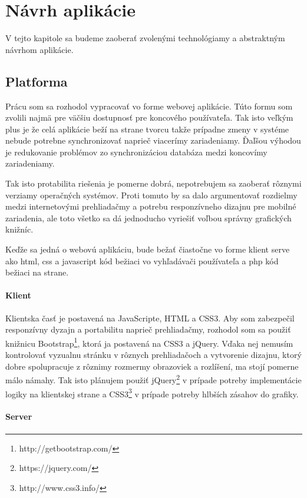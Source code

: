 \newpage

\section{Návrh aplikácie}

V tejto kapitole sa budeme zaoberať zvolenými technológiamy a abstraktným návrhom 
aplikácie.

\subsection{Platforma}

Prácu som sa rozhodol vypracovať vo forme webovej aplikácie.
Túto formu som zvolili najmä pre väčšiu dostupnosť pre koncového používateľa.
Tak isto veľkým plus je že celá aplikácie beží na strane tvorcu takže prípadne zmeny 
v systéme nebude potrebne synchronizovať naprieč viacerímy zariadeniamy. 
Ďaľšou výhodou je redukovanie problémov zo synchronizáciou databáza medzi koncovímy
zariadeniamy.

Tak isto protabilita riešenia je pomerne dobrá, nepotrebujem sa zaoberať rôznymi verziamy
operačných systémov. Proti tomuto by sa dalo argumentovať rozdielmy medzi 
internetovými prehliadačmy a potrebu responzívneho dizajnu pre mobilné zariadenia,
ale toto všetko sa dá jednoducho vyriešiť voľbou správny grafických knižníc.

Keďže sa jedná o webovú aplikáciu, bude bežať čiastočne vo forme klient serve ako 
html, css a javascript kód bežiaci vo vyhľadávači používateľa a php kód bežiaci na strane.

\paragraph{Klient}

Klientska časť je postavená na JavaScripte, HTML a CSS3. Aby som zabezpečil responzívny 
dyzajn a portabilitu naprieč prehliadačmy, rozhodol som sa použiť knižnicu
Bootstrap\footnote{http://getbootstrap.com/},
ktorá ja postavená na CSS3 a jQuery. Vďaka nej nemusím kontrolovať vyzualnu stránku v 
rôznych prehliadačoch a vytvorenie dizajnu, ktorý dobre spolupracuje z rôznimy rozmermy
obrazoviek a rozlíšení, ma stojí pomerne málo námahy. Tak isto plánujem použiť 
jQuery\footnote{https://jquery.com/} v prípade potreby implementácie logiky na klientskej strane
a CSS3\footnote{http://www.css3.info/} v prípade potreby hlbších zásahov do grafiky.

\paragraph{Server}

